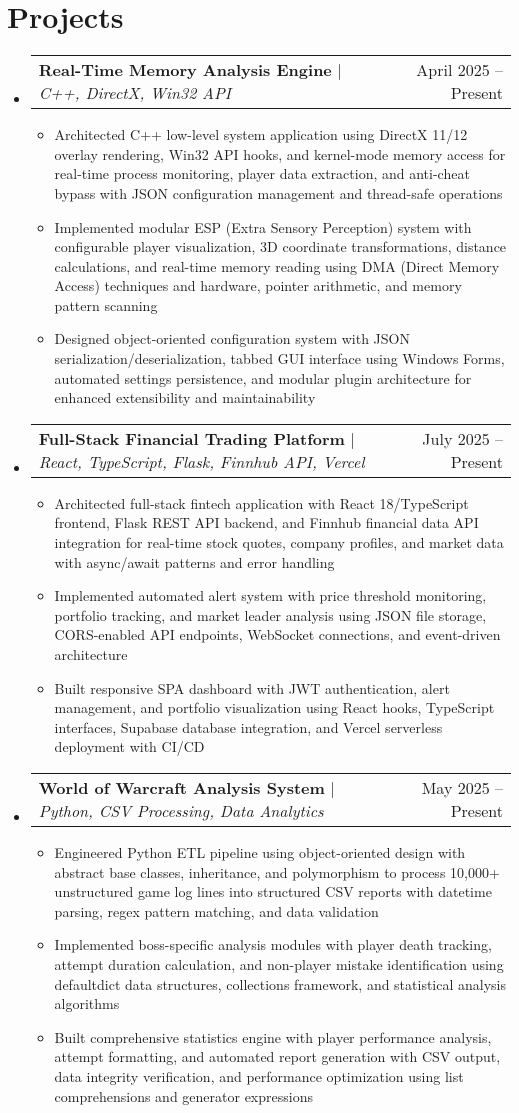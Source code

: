 \documentclass[letterpaper,11pt]{article}
\makeatletter
\newcommand{\resumeItem}[1]{
  \item\small{
    {#1 \vspace{-2pt}}
  }
}
\newcommand{\resumeProjectHeading}[2]{
    \item
    \begin{tabular*}{0.97\textwidth}{l@{\extracolsep{\fill}}r}
      \small#1 & #2 \\
    \end{tabular*}\vspace{-7pt}
}
\newcommand{\resumeSubHeadingListStart}{\begin{itemize}[leftmargin=0.15in, label={}]}
\newcommand{\resumeSubHeadingListEnd}{\end{itemize}}
\newcommand{\resumeItemListStart}{\begin{itemize}}
\newcommand{\resumeItemListEnd}{\end{itemize}\vspace{-5pt}}
\makeatother
\begin{document}
\section{Projects}
    \resumeSubHeadingListStart
    \resumeProjectHeading
      {\textbf{Real-Time Memory Analysis Engine} $|$ \emph{C++, DirectX, Win32 API}}{April 2025 -- Present}
      \resumeItemListStart
        \resumeItem{Architected C++ low-level system application using DirectX 11/12 overlay rendering, Win32 API hooks, and kernel-mode memory access for real-time process monitoring, player data extraction, and anti-cheat bypass with JSON configuration management and thread-safe operations}
        \resumeItem{Implemented modular ESP (Extra Sensory Perception) system with configurable player visualization, 3D coordinate transformations, distance calculations, and real-time memory reading using DMA (Direct Memory Access) techniques and hardware, pointer arithmetic, and memory pattern scanning}
        \resumeItem{Designed object-oriented configuration system with JSON serialization/deserialization, tabbed GUI interface using Windows Forms, automated settings persistence, and modular plugin architecture for enhanced extensibility and maintainability}
      \resumeItemListEnd
    \resumeProjectHeading
      {\textbf{Full-Stack Financial Trading Platform} $|$ \emph{React, TypeScript, Flask, Finnhub API, Vercel}}{July 2025 -- Present}
      \resumeItemListStart
        \resumeItem{Architected full-stack fintech application with React 18/TypeScript frontend, Flask REST API backend, and Finnhub financial data API integration for real-time stock quotes, company profiles, and market data with async/await patterns and error handling}
        \resumeItem{Implemented automated alert system with price threshold monitoring, portfolio tracking, and market leader analysis using JSON file storage, CORS-enabled API endpoints, WebSocket connections, and event-driven architecture}
        \resumeItem{Built responsive SPA dashboard with JWT authentication, alert management, and portfolio visualization using React hooks, TypeScript interfaces, Supabase database integration, and Vercel serverless deployment with CI/CD}
      \resumeItemListEnd
    \resumeProjectHeading
      {\textbf{World of Warcraft Analysis System} $|$ \emph{Python, CSV Processing, Data Analytics}}{May 2025 -- Present}
      \resumeItemListStart
        \resumeItem{Engineered Python ETL pipeline using object-oriented design with abstract base classes, inheritance, and polymorphism to process 10,000+ unstructured game log lines into structured CSV reports with datetime parsing, regex pattern matching, and data validation}
        \resumeItem{Implemented boss-specific analysis modules with player death tracking, attempt duration calculation, and non-player mistake identification using defaultdict data structures, collections framework, and statistical analysis algorithms}
        \resumeItem{Built comprehensive statistics engine with player performance analysis, attempt formatting, and automated report generation with CSV output, data integrity verification, and performance optimization using list comprehensions and generator expressions}
      \resumeItemListEnd
    \resumeSubHeadingListEnd
\end{document}
